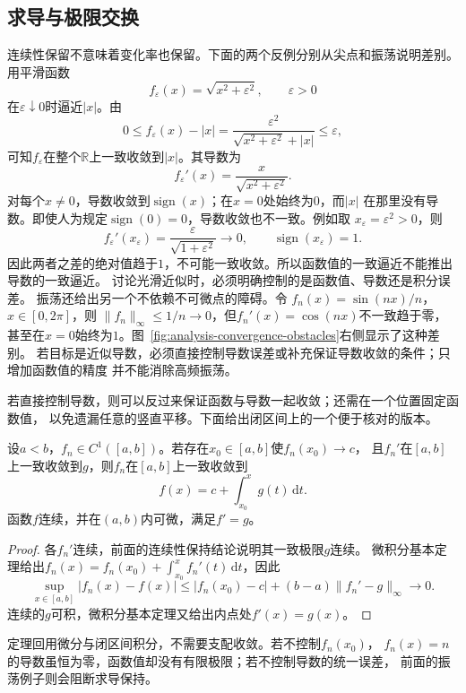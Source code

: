 \subsection{求导与极限交换}

连续性保留不意味着变化率也保留。下面的两个反例分别从尖点和振荡说明差别。
用平滑函数
\[   f_{\varepsilon}(x)=\sqrt{x^2+\varepsilon^2},   \qquad \varepsilon>0 \]
在$\varepsilon\downarrow0$时逼近$|x|$。由
\[   0\leq f_{\varepsilon}(x)-|x|   =   \frac{\varepsilon^2}   {\sqrt{x^2+\varepsilon^2}+|x|}   \leq\varepsilon, \]
可知$f_{\varepsilon}$在整个$\mathbb{R}$上一致收敛到$|x|$。其导数为
\[   f_{\varepsilon}'(x)   =   \frac{x}{\sqrt{x^2+\varepsilon^2}}. \]
对每个$x\neq0$，导数收敛到$\operatorname{sign}(x)$；在$x=0$处始终为$0$，而$|x|$
在那里没有导数。即使人为规定$\operatorname{sign}(0)=0$，导数收敛也不一致。例如取
$x_\varepsilon=\varepsilon^2>0$，则
\[
  f_\varepsilon'(x_\varepsilon)
  =
  \frac{\varepsilon}{\sqrt{1+\varepsilon^2}}
  \longrightarrow0,
  \qquad
  \operatorname{sign}(x_\varepsilon)=1.
\]
因此两者之差的绝对值趋于$1$，不可能一致收敛。所以函数值的一致逼近不能推出导数的一致逼近。
讨论光滑近似时，必须明确控制的是函数值、导数还是积分误差。
振荡还给出另一个不依赖不可微点的障碍。令
$f_n(x)=\sin(nx)/n$，$x\in[0,2\pi]$，则
$\lVert f_n\rVert_\infty\leq1/n\to0$，但$f_n'(x)=\cos(nx)$不一致趋于零，
甚至在$x=0$始终为$1$。图~\ref{fig:analysis-convergence-obstacles}右侧显示了这种差别。
若目标是近似导数，必须直接控制导数误差或补充保证导数收敛的条件；只增加函数值的精度
并不能消除高频振荡。

若直接控制导数，则可以反过来保证函数与导数一起收敛；还需在一个位置固定函数值，
以免遗漏任意的竖直平移。下面给出闭区间上的一个便于核对的版本。
\begin{theorem}[一致导数逼近与求导保持]
\label{thm:analysis-uniform-derivative-limit}
设$a<b$，$f_n\in C^1([a,b])$。若存在$x_0\in[a,b]$使$f_n(x_0)\to c$，
且$f_n'$在$[a,b]$上一致收敛到$g$，则$f_n$在$[a,b]$上一致收敛到
\[
 f(x)=c+\int_{x_0}^xg(t)\,\mathrm dt.
\]
函数$f$连续，并在$(a,b)$内可微，满足$f'=g$。
\end{theorem}
\begin{proof}
各$f_n'$连续，前面的连续性保持结论说明其一致极限$g$连续。
微积分基本定理给出$f_n(x)=f_n(x_0)+\int_{x_0}^xf_n'(t)\,\mathrm dt$，因此
\[
 \sup_{x\in[a,b]}|f_n(x)-f(x)|
 \leq |f_n(x_0)-c|+(b-a)\lVert f_n'-g\rVert_\infty
 \longrightarrow0.
\]
连续的$g$可积，微积分基本定理又给出内点处$f'(x)=g(x)$。
\end{proof}
定理回用微分与闭区间积分，不需要支配收敛。若不控制$f_n(x_0)$，
$f_n(x)=n$的导数虽恒为零，函数值却没有有限极限；若不控制导数的统一误差，
前面的振荡例子则会阻断求导保持。

